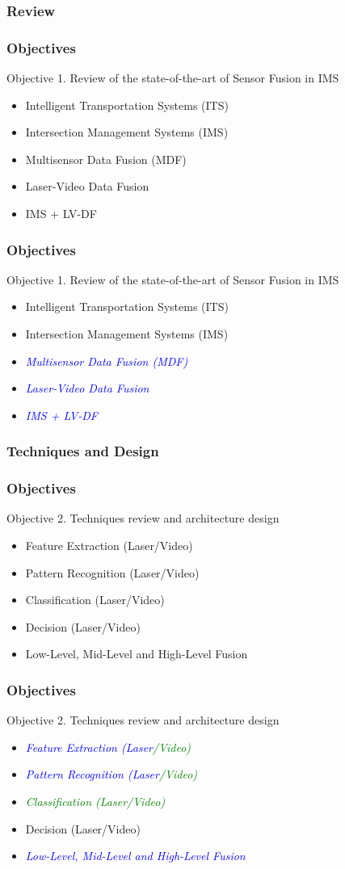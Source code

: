 \documentclass{beamer}
\begin{document}
\subsubsection{Review}
\frame
{
	\frametitle{Objectives}
	Objective 1. Review of the state-of-the-art of Sensor Fusion in IMS
	\begin{itemize}
		\item Intelligent Transportation Systems (ITS)
		\item Intersection Management Systems (IMS)
		\item Multisensor Data Fusion (MDF)
		\item Laser-Video Data Fusion
		\item IMS + LV-DF
	\end{itemize}
}

\frame
{
	\frametitle{Objectives}
	Objective 1. Review of the state-of-the-art of Sensor Fusion in IMS
	\begin{itemize}
		\item Intelligent Transportation Systems (ITS)
		\item Intersection Management Systems (IMS)
		\item \textcolor{blue}{\emph{Multisensor Data Fusion (MDF)}}
		\item \textcolor{blue}{\emph{Laser-Video Data Fusion}}
		\item \textcolor{blue}{\emph{IMS + LV-DF}}
	\end{itemize}
}
\subsubsection{Techniques and Design}
\frame
{
	\frametitle{Objectives}
	Objective 2. Techniques review and architecture design
	\begin{itemize}
		\item Feature Extraction (Laser/Video)
		\item Pattern Recognition (Laser/Video)
		\item Classification (Laser/Video)
		\item Decision (Laser/Video)
		\item Low-Level, Mid-Level and High-Level Fusion
	\end{itemize}
}

\frame
{
	\frametitle{Objectives}
	Objective 2. Techniques review and architecture design
	\begin{itemize}		
		\item \textcolor{blue}{\emph{Feature Extraction (Laser}}\textcolor{green}{\emph{/Video)}}
		\item \textcolor{blue}{\emph{Pattern Recognition (Laser}}\textcolor{green}{\emph{/Video)}}
		\item \textcolor{green}{\emph{Classification (Laser/Video)}}
		\item Decision (Laser/Video)
		\item \textcolor{blue}{\emph{Low-Level, Mid-Level and High-Level Fusion}}
	\end{itemize}
}
\end{document}
